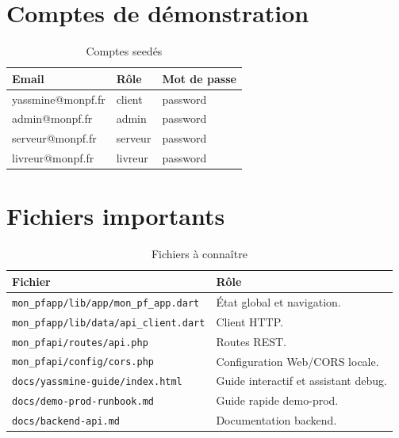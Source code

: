 \documentclass[12pt,a4paper]{report}
\begin{document}
\chapter{Comptes de démonstration}
\begin{table}[H]
\centering
\caption{Comptes seedés}
\begin{tabular}{p{6cm}p{4cm}p{4cm}}
\toprule
\textbf{Email} & \textbf{Rôle} & \textbf{Mot de passe}\\
\midrule
yassmine@monpf.fr & client & password\\
admin@monpf.fr & admin & password\\
serveur@monpf.fr & serveur & password\\
livreur@monpf.fr & livreur & password\\
\bottomrule
\end{tabular}
\end{table}

\chapter{Fichiers importants}
\begin{longtable}{p{7cm}p{7cm}}
\caption{Fichiers à connaître}\\
\toprule
\textbf{Fichier} & \textbf{Rôle}\\
\midrule
\nolinkurl{mon_pfapp/lib/app/mon_pf_app.dart} & État global et navigation.\\
\nolinkurl{mon_pfapp/lib/data/api_client.dart} & Client HTTP.\\
\nolinkurl{mon_pfapi/routes/api.php} & Routes REST.\\
\nolinkurl{mon_pfapi/config/cors.php} & Configuration Web/CORS locale.\\
\nolinkurl{docs/yassmine-guide/index.html} & Guide interactif et assistant debug.\\
\nolinkurl{docs/demo-prod-runbook.md} & Guide rapide demo-prod.\\
\nolinkurl{docs/backend-api.md} & Documentation backend.\\
\bottomrule
\end{longtable}
\end{document}
